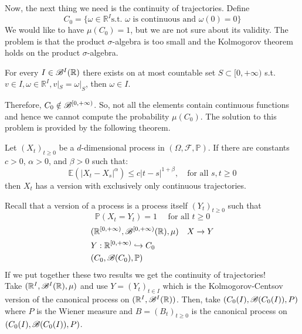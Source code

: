 \documentclass[crop=false, class=article]{standalone}
\begin{document}
	Now, the next thing we need is the continuity of trajectories. Define
	\begin{equation*}
		C_0=\{\omega \in \mathbb{R}^I \text{s.t. } \omega \text{ is continuous and } \omega(0) = 0\}
	\end{equation*}
	We would like to have $\mu(C_0) = 1$, but we are not sure about its validity. The problem is that the product $\sigma$-algebra is too small and the Kolmogorov theorem holds on the product $\sigma$-algebra.
	\begin{lemma}
		For every $I \in \mathscr{B}^I(\mathbb{R})$ there exists on at most countable set $S \subset [0,+\infty)$ s.t. $v \in I, \omega \in \mathbb{R}^I, v|_S = \omega |_S$, then $\omega \in I$. 
	\end{lemma}
	Therefore, $C_0 \notin \mathscr{B}^{[0,+\infty)}$. So, not all the elements contain continuous functions and hence we cannot compute the probability $\mu(C_0)$. The solution to this problem is provided by the following theorem.
	\begin{theorem}
		Let \((X_t)_{t \geq 0}\) be a \(d\)-dimensional process in \((\Omega, \mathcal{F}, \mathbb{P})\). If there are constants \(c > 0\), \(\alpha > 0\), and \(\beta > 0\) such that:
		\begin{equation*}
			\mathbb{E} \left( |X_t - X_s|^\alpha \right) \leq c |t - s|^{1 + \beta}, \quad \text{for all } s, t \geq 0
		\end{equation*}
		then \(X_t\) has a version with exclusively only continuous trajectories.
	\end{theorem}
	Recall that a version of a process is a process itself $(Y_t)_{t \geq 0}$ such that 
	\begin{equation*}
		\mathbb{P}(X_t = Y_t) = 1 \quad \text{ for all } t \geq 0
	\end{equation*}
	\begin{equation*}
		\begin{split}
			& (\mathbb{R}^{[0, +\infty)}, \mathscr{B}^{[0,+\infty)}(\mathbb{R}), \mu) \quad X \rightarrow Y \\
			& Y: \mathbb{R}^{[0,+\infty)} \hookrightarrow C_0 \\
			& (C_0, \mathscr{B}(C_0), \mathbb{P})
		\end{split}
	\end{equation*}
	If we put together these two results we get the continuity of trajectories! \\
	Take $(\mathbb{R}^I, \mathscr{B}^I(\mathbb{R}), \mu)$ and use $Y=(Y_t)_{t \in I}$ which is the Kolmogorov-Centsov version of the canonical process on $(\mathbb{R}^I, \mathscr{B}^I(\mathbb{R}))$. Then, take $(C_0(I), \mathscr{B}(C_0(I)), P)$ where $P$ is the Wiener measure and $B = (B_t)_{t \geq 0}$ is the canonical process on $(C_0(I), \mathscr{B}(C_0(I)), P)$. 
\end{document}

